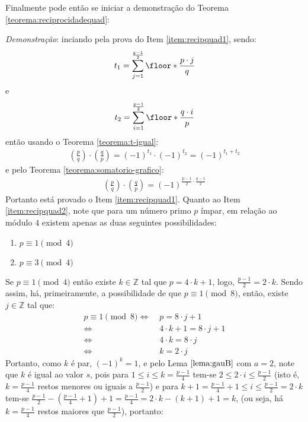 Finalmente pode então se iniciar a demonstração do Teorema \ref{teorema:reciprocidadequad}:

\noindent
\textit{Demonstração}: inciando pela prova do Item \ref{item:recipquad1}, sendo:
\begin{equation*}
    t_1 = \sum_{j = 1}^{\frac{q-1}{2}} \floor*{\frac{p \cdot j}{q}}
\end{equation*}
e
\begin{equation*}
    t_2 = \sum_{i = 1}^{\frac{p-1}{2}} \floor*{\frac{q \cdot i}{p}}
\end{equation*} 
então usando o Teorema \ref{teorema:t-igual}:
\begin{align*}
    \left(\frac{p}{q} \right) \cdot \left(\frac{q}{p} \right) = (-1)^{t_1} \cdot (-1)^{t_2} = (-1)^{t_1 + t_2} 
\end{align*}
e pelo Teorema \ref{teorema:somatorio-grafico}:
\begin{align*}
    \left(\frac{p}{q} \right) \cdot \left(\frac{q}{p} \right) = (-1)^{\frac{p-1}{2} \cdot \frac{q-1}{2}}
\end{align*}
Portanto está provado o Item \ref{item:recipquad1}. Quanto ao Item \ref{item:recipquad2}, note que para um número primo $p$ ímpar, em relação ao módulo $4$ existem apenas as duas seguintes possibilidades:
\begin{enumerate}
    \item $p \equiv 1 \pmod{4}$
    \item $p \equiv 3 \pmod{4}$
\end{enumerate}
Se $p \equiv 1 \pmod{4}$ então existe $k \in \mathbb{Z}$ tal que $p = 4 \cdot k + 1$, logo, $\frac{p-1}{2} = 2 \cdot k$. Sendo assim, há, primeiramente, a possibilidade de que $p \equiv 1 \pmod{8}$, então, existe $j \in \mathbb{Z}$ tal que:
\begin{align*}
    p \equiv 1 \pmod{8}
    \Longleftrightarrow \; & p = 8 \cdot j + 1
    \\
    \Longleftrightarrow \; & 4 \cdot k + 1 = 8 \cdot j + 1
    \\
    \Longleftrightarrow \; & 4 \cdot k = 8 \cdot j
    \\
    \Longleftrightarrow \; & k = 2 \cdot j
\end{align*}
Portanto, como $k$ é par, $(-1)^k = 1$, e pelo Lema $\ref{lema:gauB}$ com $a = 2$, note que $k$ é igual ao valor $s$, pois para $1 \leq i \leq k = \frac{p-1}{4}$ tem-se $2 \leq 2\cdot i \leq \frac{p-1}{2}$ (isto é, $k = \frac{p-1}{4}$ restos menores ou iguais a $\frac{p-1}{2}$) e para $ k + 1 = \frac{p-1}{4} + 1 \leq i \leq \frac{p-1}{2} = 2 \cdot k$ tem-se $\frac{p-1}{2} - \left(\frac{p-1}{4} + 1\right) + 1 = \frac{p-1}{4} = 2 \cdot k - (k + 1) + 1 = k$, (ou seja, há $k = \frac{p-1}{4}$ restos maiores que $\frac{p-1}{2}$), portanto:

